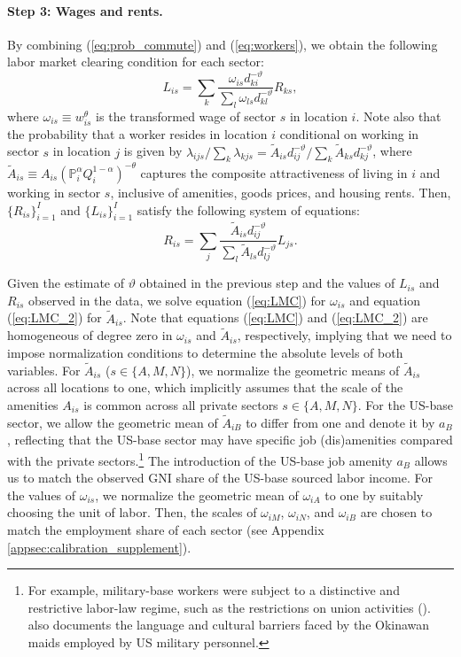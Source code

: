 \documentclass[12pt, unicode, a4paper]{article}
\newcommand{\1}{\mbox{1}\hspace{-0.25em}\mbox{l}} %
\begin{document}
\paragraph{Step 3: Wages and rents.}

By combining (\ref{eq:prob_commute}) and (\ref{eq:workers}), we obtain the following labor market clearing condition for each sector:
\begin{equation}
\label{eq:LMC}
    L_{is}=\sum_k \frac{\omega_{is} d_{ki}^{-\vartheta}}{\sum_l \omega_{ls} d_{kl}^{-\vartheta}} R_{ks},
\end{equation}
where $\omega_{is} \equiv w_{is}^\theta$ is the transformed wage of sector $s$ in location $i$. Note also that the probability that a worker resides in location $i$ conditional on working in sector $s$ in location $j$ is given by $\lambda_{ijs}/\sum_k \lambda_{kjs}=\widetilde{A}_{is}d_{ij}^{-\vartheta}/\sum_k \widetilde{A}_{ks}d_{kj}^{-\vartheta}$, where $\widetilde{A}_{is} \equiv A_{is}\left(\mathbb{P}_{i}^{\alpha}Q_i^{1-\alpha}\right)^{-\theta}$ captures the composite attractiveness of living in $i$ and working in sector $s$, inclusive of amenities, goods prices, and housing rents. Then, $\{R_{is}\}_{i=1}^I$ and $\{L_{is}\}_{i=1}^I$ satisfy the following system of equations:
\begin{equation}
\label{eq:LMC_2}
    R_{is}=\sum_j \frac{\widetilde{A}_{is}d_{ij}^{-\vartheta}}{\sum_l \widetilde{A}_{ls}d_{lj}^{-\vartheta}}L_{js} .
\end{equation}

Given the estimate of $\vartheta$ obtained in the previous step and the values of $L_{is}$ and $R_{is}$ observed in the data, we solve equation (\ref{eq:LMC}) for $\omega_{is}$ and equation  (\ref{eq:LMC_2}) for $\widetilde{A}_{is}$. Note that equations (\ref{eq:LMC}) and (\ref{eq:LMC_2}) are homogeneous of degree zero in $\omega_{is}$ and $\widetilde{A}_{is}$, respectively, implying that we need to impose normalization conditions to determine the absolute levels of both variables. For $\widetilde{A}_{is}$ ($s \in \{ A,M,N \}$), we normalize the geometric means of $\widetilde{A}_{is}$ across all locations to one, which implicitly assumes that the scale of the amenities $A_{is}$ is common across all private sectors $s \in \{ A,M,N \}$. For the US-base sector, we allow the geometric mean of $\widetilde{A}_{iB}$ to differ from one and denote it by $a_B$, reflecting that the US-base sector may have specific job (dis)amenities compared with the private sectors.\footnote{
For example, military-base workers were subject to a distinctive and restrictive labor-law regime, such as the restrictions on union activities  (\citealt{Toya2019LabourRelationsCommission}).  \cite{Fukuyama2023OkinawanMaids} also documents the language and cultural barriers faced by the Okinawan maids employed by US military personnel.
}
The introduction of the US-base job amenity $a_B$ allows us to match the observed GNI share of the US-base sourced labor income.  
For the values of $\omega_{is}$, we normalize the geometric mean of $\omega_{iA}$ to one by suitably choosing the unit of labor. Then, the scales of $\omega_{iM}$, $\omega_{iN}$, and $\omega_{iB}$ are chosen to match the employment share of each sector (see Appendix \ref{appsec:calibration_supplement}).
\end{document}
